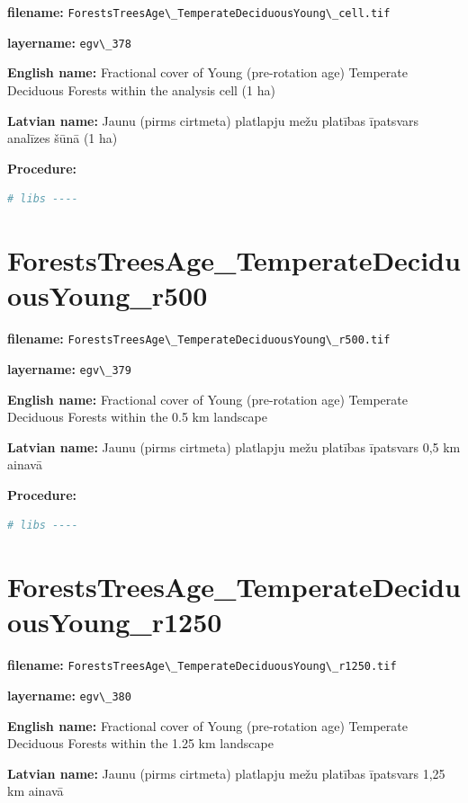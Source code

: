 \documentclass[
]{book}
\newcommand{\passthrough}[1]{#1}
\begin{document}
\textbf{filename:} \passthrough{\lstinline!ForestsTreesAge\_TemperateDeciduousYoung\_cell.tif!}

\textbf{layername:} \passthrough{\lstinline!egv\_378!}

\textbf{English name:} Fractional cover of Young (pre-rotation age) Temperate Deciduous Forests within the analysis cell (1 ha)

\textbf{Latvian name:} Jaunu (pirms cirtmeta) platlapju mežu platības īpatsvars analīzes šūnā (1 ha)

\textbf{Procedure:}

\begin{lstlisting}[language=R]
# libs ----
\end{lstlisting}

\section{ForestsTreesAge\_TemperateDeciduousYoung\_r500}\label{ch06.379}

\textbf{filename:} \passthrough{\lstinline!ForestsTreesAge\_TemperateDeciduousYoung\_r500.tif!}

\textbf{layername:} \passthrough{\lstinline!egv\_379!}

\textbf{English name:} Fractional cover of Young (pre-rotation age) Temperate Deciduous Forests within the 0.5 km landscape

\textbf{Latvian name:} Jaunu (pirms cirtmeta) platlapju mežu platības īpatsvars 0,5 km ainavā

\textbf{Procedure:}

\begin{lstlisting}[language=R]
# libs ----
\end{lstlisting}

\section{ForestsTreesAge\_TemperateDeciduousYoung\_r1250}\label{ch06.380}

\textbf{filename:} \passthrough{\lstinline!ForestsTreesAge\_TemperateDeciduousYoung\_r1250.tif!}

\textbf{layername:} \passthrough{\lstinline!egv\_380!}

\textbf{English name:} Fractional cover of Young (pre-rotation age) Temperate Deciduous Forests within the 1.25 km landscape

\textbf{Latvian name:} Jaunu (pirms cirtmeta) platlapju mežu platības īpatsvars 1,25 km ainavā
\end{document}
